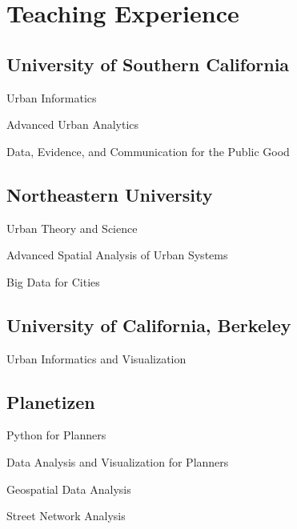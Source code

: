 \documentclass[12pt,letterpaper]{report}
\newcommand{\listitemspace}{0.25em}
\renewenvironment{itemize}
{\begin{list}{}{\setlength{\leftmargin}{0em}
            \setlength{\parskip}{0em}
            \setlength{\itemsep}{\listitemspace}
            \setlength{\parsep}{\listitemspace}}}
{\end{list}}
\begin{document}
    \section*{Teaching Experience}

    \subsection*{University of Southern California}

    \begin{itemize}

        \item Urban Informatics
        \item Advanced Urban Analytics
        \item Data, Evidence, and Communication for the Public Good

    \end{itemize}

    \subsection*{Northeastern University}

    \begin{itemize}

        \item Urban Theory and Science
        \item Advanced Spatial Analysis of Urban Systems
        \item Big Data for Cities

    \end{itemize}

    \subsection*{University of California, Berkeley}

    \begin{itemize}

        \item Urban Informatics and Visualization

    \end{itemize}

    \subsection*{Planetizen}

    \begin{itemize}

        \item Python for Planners
        \item Data Analysis and Visualization for Planners
        \item Geospatial Data Analysis
        \item Street Network Analysis

    \end{itemize}
\end{document}
